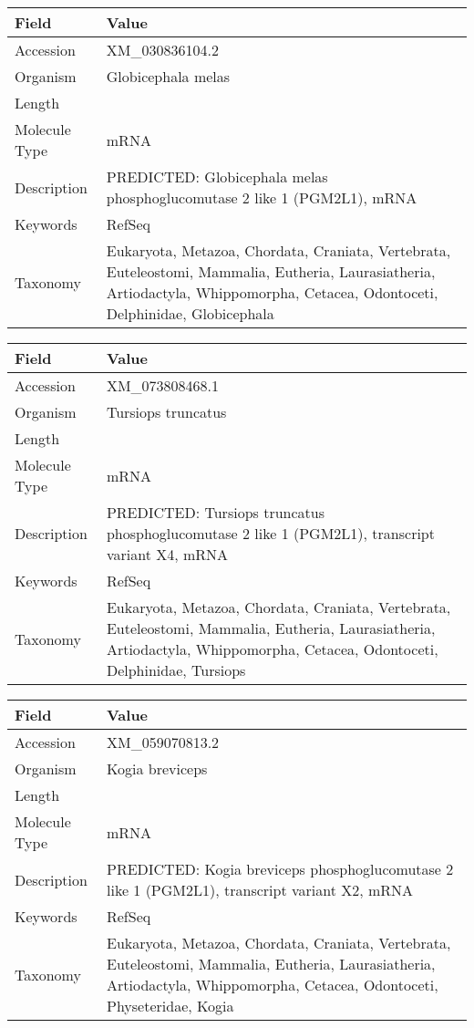 \documentclass[10pt]{article}
\begin{document}
{\footnotesize
\begin{longtable}{>{\raggedright\arraybackslash}p{4.5cm} >{\raggedright\arraybackslash}p{11.5cm}}
\textbf{Field} & \textbf{Value} \\
\hline
Accession & XM\_030836104.2 \\
Organism & Globicephala melas \\
Length & 8027 \\
Molecule Type & mRNA \\
Description & PREDICTED: Globicephala melas phosphoglucomutase 2 like 1 (PGM2L1), mRNA \\
Keywords & RefSeq \\
Taxonomy & Eukaryota, Metazoa, Chordata, Craniata, Vertebrata, Euteleostomi, Mammalia, Eutheria, Laurasiatheria, Artiodactyla, Whippomorpha, Cetacea, Odontoceti, Delphinidae, Globicephala \\
\end{longtable}
}

{\footnotesize
\begin{longtable}{>{\raggedright\arraybackslash}p{4.5cm} >{\raggedright\arraybackslash}p{11.5cm}}
\textbf{Field} & \textbf{Value} \\
\hline
Accession & XM\_073808468.1 \\
Organism & Tursiops truncatus \\
Length & 3041 \\
Molecule Type & mRNA \\
Description & PREDICTED: Tursiops truncatus phosphoglucomutase 2 like 1 (PGM2L1), transcript variant X4, mRNA \\
Keywords & RefSeq \\
Taxonomy & Eukaryota, Metazoa, Chordata, Craniata, Vertebrata, Euteleostomi, Mammalia, Eutheria, Laurasiatheria, Artiodactyla, Whippomorpha, Cetacea, Odontoceti, Delphinidae, Tursiops \\
\end{longtable}
}

{\footnotesize
\begin{longtable}{>{\raggedright\arraybackslash}p{4.5cm} >{\raggedright\arraybackslash}p{11.5cm}}
\textbf{Field} & \textbf{Value} \\
\hline
Accession & XM\_059070813.2 \\
Organism & Kogia breviceps \\
Length & 7235 \\
Molecule Type & mRNA \\
Description & PREDICTED: Kogia breviceps phosphoglucomutase 2 like 1 (PGM2L1), transcript variant X2, mRNA \\
Keywords & RefSeq \\
Taxonomy & Eukaryota, Metazoa, Chordata, Craniata, Vertebrata, Euteleostomi, Mammalia, Eutheria, Laurasiatheria, Artiodactyla, Whippomorpha, Cetacea, Odontoceti, Physeteridae, Kogia \\
\end{longtable}
}
\end{document}
